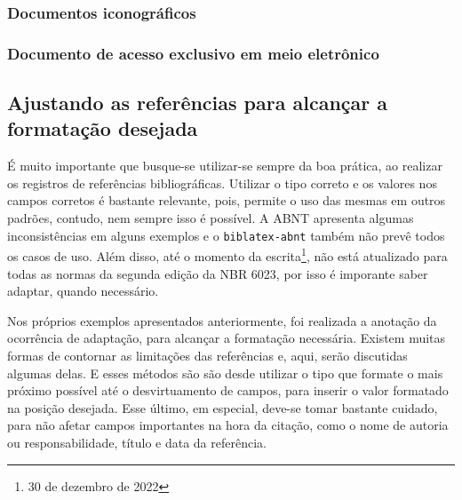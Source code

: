 


\subsubsection{Documentos iconográficos}



\subsubsection{Documento de acesso exclusivo em meio eletrônico}




\subsection{Ajustando as referências para alcançar a formatação desejada}
É muito importante que busque-se utilizar-se sempre da boa prática, ao realizar os registros de referências bibliográficas. Utilizar o tipo correto e os valores nos campos corretos é bastante relevante, pois, permite o uso das mesmas em outros padrões, contudo, nem sempre isso é possível. A ABNT apresenta algumas inconsistências em alguns exemplos e o \texttt{biblatex-abnt} também não prevê todos os casos de uso. Além disso, até o momento da escrita\footnote{30 de dezembro de 2022}, não está atualizado para todas as normas da segunda edição da NBR 6023, por isso é imporante saber adaptar, quando necessário. 

Nos próprios exemplos apresentados anteriormente, foi realizada a anotação da ocorrência de adaptação, para alcançar a formatação necessária. Existem muitas formas de contornar as limitações das referências e, aqui, serão discutidas algumas delas. E esses métodos são são desde utilizar o tipo que formate o mais próximo possível até o desvirtuamento de campos, para inserir o valor formatado na posição desejada. Esse último, em especial, deve-se tomar bastante cuidado, para não afetar campos importantes na hora da citação, como o nome de autoria ou responsabilidade, título e data da referência.

